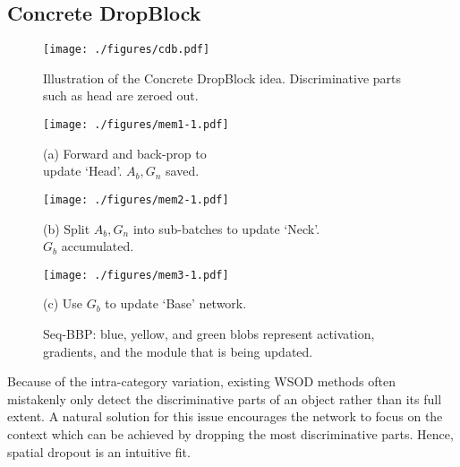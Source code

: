 \documentclass[10pt,twocolumn,letterpaper]{article}
\begin{document}
\subsection{Concrete DropBlock}
\label{sec:dropout}

\begin{figure}[t]
\centering
\texttt{[image: ./figures/cdb.pdf]}
\vspace{-2em}
\caption{Illustration of the Concrete DropBlock idea. Discriminative parts such as head are zeroed out.} 
\label{fig:dropblock}
\vspace{-1em}
\end{figure}

\begin{figure*}[t]
\centering
\begin{minipage}{.28\textwidth}
\centering
\texttt{[image: ./figures/mem1-1.pdf]}
\vspace{-2.5em}
\captionsetup{labelformat=empty}
\caption{(a) Forward and back-prop to \\update `Head'. $A_b, G_n$ saved.}
\end{minipage}
\begin{minipage}{.48\textwidth}
\centering
\texttt{[image: ./figures/mem2-1.pdf]}
\vspace{-2.5em}
\captionsetup{labelformat=empty}
\caption{(b) Split $A_b, G_n$ into sub-batches to update `Neck'. \\$G_b$ accumulated.}
\end{minipage}
\begin{minipage}{.19\textwidth}
\centering
\texttt{[image: ./figures/mem3-1.pdf]}
\vspace{-2em}
\captionsetup{labelformat=empty}
\caption{(c) Use $G_b$ to update `Base' network. }
\end{minipage}
\vspace{-1em}
\caption{Seq-BBP:  {\color{blue}blue}, {\color{yellow}yellow}, and {\color{green}green} blobs represent activation, gradients, and the module that is being updated.}
\label{fig:step-bp}
\vspace{-1.5em}
\end{figure*}

Because of the intra-category variation, existing WSOD methods often mistakenly only detect the discriminative parts of an object rather than its full extent. A natural solution for this issue encourages the network to focus on the context which can be achieved by dropping the most discriminative parts. Hence, spatial dropout is an intuitive fit. 
\end{document}
